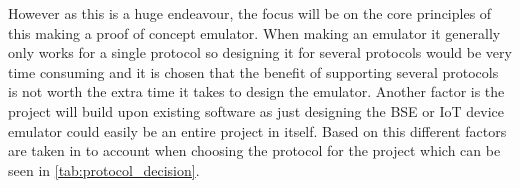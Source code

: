 However as this is a huge endeavour, the focus will be on the core principles of this making a proof of concept emulator. When making an emulator it generally only works for a single protocol so designing it for several protocols would be very time consuming and it is chosen that the benefit of supporting several protocols is not worth the extra time it takes to design the emulator. Another factor is the project will build upon existing software as just designing the \gls{BSE} or \gls{IoT} device emulator could easily be an entire project in itself. Based on this different factors are taken in to account when choosing the protocol for the project which can be seen in \autoref{tab:protocol_decision}.

